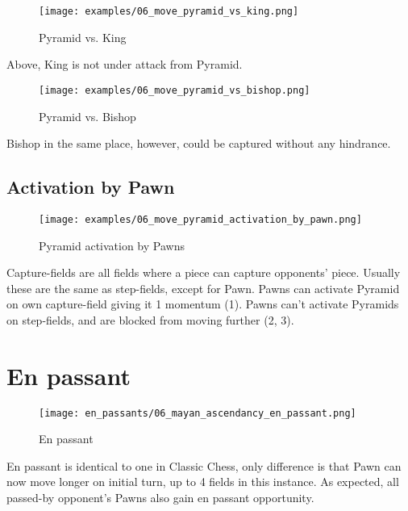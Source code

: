 \noindent
\begin{figure}[!h]
\texttt{[image: examples/06\_move\_pyramid\_vs\_king.png]}
\caption{Pyramid vs. King}
\label{fig:06_move_pyramid_vs_king}
\end{figure}

Above, King is not under attack from Pyramid.

\noindent
\begin{figure}[!h]
\texttt{[image: examples/06\_move\_pyramid\_vs\_bishop.png]}
\caption{Pyramid vs. Bishop}
\label{fig:06_move_pyramid_vs_bishop}
\end{figure}

Bishop in the same place, however, could be captured without any hindrance.

\clearpage %

\subsection*{Activation by Pawn}

\noindent
\begin{figure}[!h]
\texttt{[image: examples/06\_move\_pyramid\_activation\_by\_pawn.png]}
\caption{Pyramid activation by Pawns}
\label{fig:06_move_pyramid_activation_by_pawn}
\end{figure}

Capture-fields are all fields where a piece can capture opponents' piece.
Usually these are the same as step-fields, except for Pawn. Pawns can activate
Pyramid on own capture-field giving it 1 momentum (1). Pawns can't activate
Pyramids on step-fields, and are blocked from moving further (2, 3).

\clearpage %

\section*{En passant}

\noindent
\begin{wrapfigure}{l}{0.4\textwidth}
\centering
\texttt{[image: en\_passants/06\_mayan\_ascendancy\_en\_passant.png]}
\caption{En passant}
\label{fig:06_mayan_ascendancy_en_passant}
\end{wrapfigure}
En passant is identical to one in Classic Chess, only difference is that Pawn can now
move longer on initial turn, up to 4 fields in this instance. As expected, all passed-by
opponent's Pawns also gain en passant opportunity.

